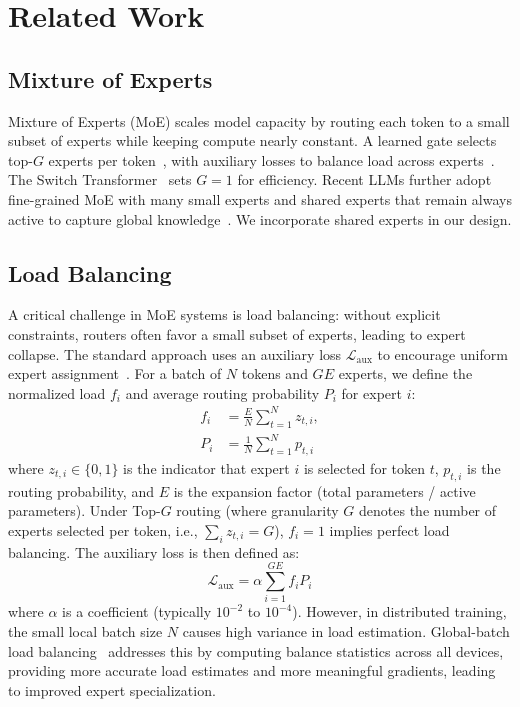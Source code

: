 \documentclass{article}
\theoremstyle{plain}
\theoremstyle{definition}
\theoremstyle{remark}
\begin{document}
\section{Related Work}

\subsection{Mixture of Experts}

Mixture of Experts (MoE) scales model capacity by routing each token to a small subset of experts while keeping compute nearly constant. A learned gate selects top-$G$ experts per token~\cite{shazeer2017outrageously}, with auxiliary losses to balance load across experts~\cite{lepikhin2021gshard}. The Switch Transformer~\cite{fedus2022switch} sets $G{=}1$ for efficiency. Recent LLMs further adopt fine-grained MoE with many small experts and shared experts that remain always active to capture global knowledge~\cite{dai2024deepseek}. We incorporate shared experts in our design.

\subsection{Load Balancing}

A critical challenge in MoE systems is load balancing: without explicit constraints, routers often favor a small subset of experts, leading to expert collapse. The standard approach uses an auxiliary loss $\mathcal{L}_{\text{aux}}$ to encourage uniform expert assignment~\cite{lepikhin2021gshard, fedus2022switch}. For a batch of $N$ tokens and $GE$ experts, we define the normalized load $f_i$ and average routing probability $P_i$ for expert $i$:
\begin{align}
f_i &= \frac{E}{N} \sum_{t=1}^N z_{t,i}, \\
P_i &= \frac{1}{N} \sum_{t=1}^N p_{t,i}
\end{align}
where $z_{t,i} \in \{0,1\}$ is the indicator that expert $i$ is selected for token $t$, $p_{t,i}$ is the routing probability, and $E$ is the expansion factor (total parameters / active parameters). Under Top-$G$ routing (where granularity $G$ denotes the number of experts selected per token, i.e., $\sum_i z_{t,i} = G$), $f_i=1$ implies perfect load balancing. The auxiliary loss is then defined as:
\begin{equation}
\mathcal{L}_{\text{aux}} = \alpha \sum_{i=1}^{GE} f_i P_i
\end{equation}
where $\alpha$ is a coefficient (typically $10^{-2}$ to $10^{-4}$).
However, in distributed training, the small local batch size $N$ causes high variance in load estimation.
Global-batch load balancing~\cite{qiu2025demonsdetailimplementingload,qwen3} addresses this by computing balance statistics across all devices, providing more accurate load estimates and more meaningful gradients, leading to improved expert specialization.
\end{document}
